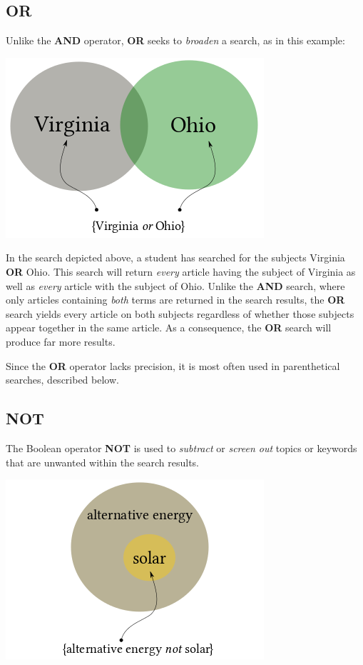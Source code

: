 {\subsection{OR}
Unlike the \textbf{AND} operator, \textbf{OR} seeks to \emph{broaden} a search, 
as in this example:

\begin{center}
\includegraphics[width=.45\textwidth]{Orcolor.png}
\end{center}

In the search depicted above, a student has searched for the subjects Virginia 
\textbf{OR} Ohio. This search will return \emph{every} article having the 
subject of Virginia as well as \emph{every} article with the subject of Ohio. 
Unlike the \textbf{AND} search, where only articles containing \emph{both} 
terms are returned in the search results, the \textbf{OR} search yields every 
article on both subjects regardless of whether those subjects appear together 
in the same article. As a consequence, the \textbf{OR} search will produce far 
more results. 

Since the \textbf{OR} operator lacks precision, it is most often used in 
parenthetical searches, described below.

\subsection{NOT}
The Boolean operator \textbf{NOT} is used to \emph{subtract} or \emph{screen 
out} topics or keywords that are unwanted within the search results. 


\begin{center}
\includegraphics[width=.45\textwidth]{notcolor.png}
\end{center}


}
